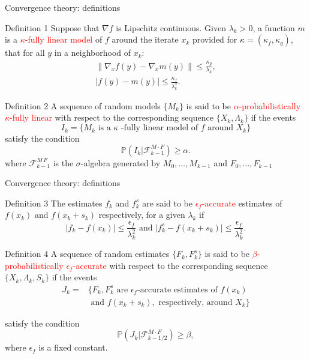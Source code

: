 \documentclass{beamer}
\begin{document}
\begin{frame}{Convergence theory: definitions}
\begin{block}{Definition 1}
Suppose that $\nabla f$ is Lipschitz continuous. Given $\lambda_k>0$, a function $m$ is a \textcolor{red}{$\kappa$-fully linear model} of $f$ around the iterate $x_k$ provided for $\kappa = (\kappa_f , \kappa_g)$, that for all $y$ in a neighborhood of $x_k$:
\begin{align*}
\|\nabla_x f (y) - \nabla_x m(y)\|\leq \frac{\kappa_g}{\lambda_k}, \\
|f (y) - m(y)| \leq \frac{\kappa_f}{\lambda_k^2}.
\end{align*}    
\end{block}   
\begin{block}{Definition 2}
A sequence of random models $\{M_k\}$ is said to be \textcolor{red}{$\alpha$-probabilistically $\kappa$-fully linear} with respect to the corresponding sequence $\{X_k,\Lambda_k\}$ 
if the events
$$
I_k = \{M_k \text{ is a } \kappa\text{ -fully linear model of } f \text{ around } X_k\} 
$$
satisfy the condition
$$
\mathbb{P}(I_k|\mathcal{F}^{M\cdot F}_{k-1}) \geq \alpha.
$$
where $\mathcal{F}^{M\, F}_{k-1}$
is the $\sigma$-algebra generated by $M_0,\dots,M_{k-1}$
and $F_0,\dots,F_{k-1}$
\end{block}
\end{frame}
\begin{frame}{Convergence theory: definitions}
\begin{block}{Definition 3}
The estimates $f_k$ and $f_k^s$ are said to be \textcolor{red}{$\epsilon_f$-accurate} estimates of $f(x_k)$ and $f(x_k+s_k)$ respectively, for a given $\lambda_k$ if 
  $$
  \lvert f_k-f(x_k)\rvert\leq \frac{\epsilon_f}{\lambda_k^2} \text{ and } \lvert f_k^s-f(x_k+s_k)\rvert\leq \frac{\epsilon_f}{\lambda_k^2}.
  $$
    
\end{block}
\begin{block}{Definition 4}
A sequence of random estimates $\{F_k,F_k^s\}$ is said to be \textcolor{red}{$\beta$-probabilistically $\epsilon_f$-accurate} with respect to the corresponding sequence $\{X_k,\Lambda_k,S_k\}$
if the events
\begin{align*}
J_k =& \{F_k,F_k^s \text{ are } \epsilon_f\text{-accurate estimates of } f(x_k) \\
& \text{ and } f(x_k+s_k), \text{ respectively, around } X_k\}
\end{align*}
 

satisfy the condition
$$
\mathbb{P}(J_k|\mathcal{F}^{M\cdot F}_{k-1/2}) \geq \beta,
$$
where $\epsilon_f$ is a fixed constant.    
\end{block}
    
\end{frame}
\end{document}

